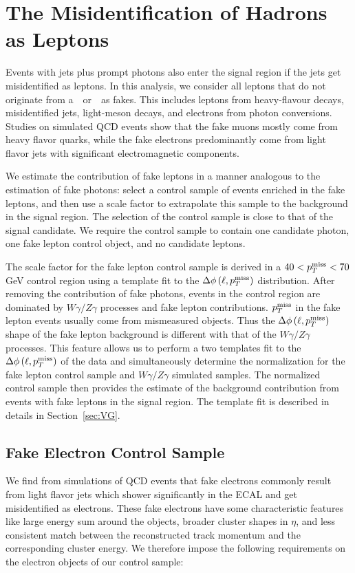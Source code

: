 \documentclass[thesis.tex]{subfiles}
\renewcommand\_{\textunderscore\allowbreak}
\begin{document}
\section{The Misidentification of Hadrons as Leptons}
\label{sec:jetfakelep}

Events with jets plus prompt photons also enter the signal region if the jets get misidentified as leptons. In this analysis,  we consider all leptons that do not originate  from a~\PWpm~or~\PZz~as  fakes. This includes leptons from heavy-flavour decays, misidentified jets, light-meson decays, and electrons from photon conversions. Studies on simulated QCD events show that the fake muons mostly come from  heavy flavor quarks, while the fake electrons predominantly come from light flavor jets with significant electromagnetic components. 

We estimate the contribution of fake leptons in a manner analogous to the
estimation of fake photons: select a control sample of events enriched in the fake leptons, and then use a scale factor to extrapolate this sample to the background in the signal region.  The selection of the control sample is close to that of the signal candidate. We require the control sample to contain one candidate photon, one fake lepton control object, and no candidate leptons. 

The scale factor for the fake lepton control sample is derived in a $40 < p_T^\textrm{miss} < 70$ GeV control region using a template fit to the
$\Delta\phi\left(\ell, p_T^\textrm{miss}\right)$ distribution. After removing the contribution of fake photons, events in the control region are dominated by $W\gamma/Z\gamma$ processes and fake lepton contributions. $p_T^\textrm{miss}$ in the fake lepton events usually come from mismeasured objects. Thus the $\Delta\phi\left(\ell, p_T^\textrm{miss}\right)$ shape of the fake lepton background is different with that of the $W\gamma/Z\gamma$ processes. This feature allows us to perform a two templates fit to the $\Delta\phi\left(\ell, p_T^\textrm{miss}\right)$ of the data and simultaneously determine the normalization for the fake lepton control sample and $W\gamma/Z\gamma$ simulated samples. The normalized control sample then provides the estimate of the
background contribution from events with fake leptons in the signal region. The template fit is described in details in Section~\ref{sec:VG}. 

\subsection{Fake Electron Control Sample}
We find from simulations of QCD events that fake electrons commonly result from light flavor jets which shower significantly in the ECAL and get misidentified as electrons. These fake electrons have some characteristic features like large energy sum around the objects,  broader cluster shapes in $\eta$, and less consistent match between the reconstructed track momentum and the corresponding cluster energy. We therefore impose the following requirements on the electron objects of our control sample:
\end{document}
